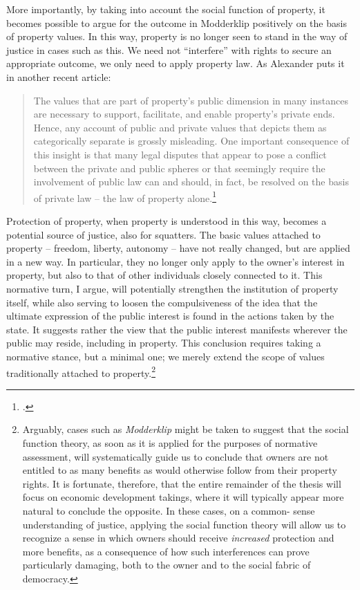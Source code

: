 More importantly, by taking into account the social function of property, it becomes possible to argue for the outcome in Modderklip positively on the basis of property values. In this way, property is no longer seen to stand in the way of justice in cases such as this. We need not ``interfere'' with rights to secure an appropriate outcome, we only need to apply property law. As Alexander puts it in another recent article: 

\begin{quote} The values that are
part of property's public dimension in many instances are necessary
to support, facilitate, and enable property's private ends.
Hence, any account of public and private values that depicts them as categorically
separate is grossly misleading. One important consequence of this
insight is that many legal disputes that appear to pose a conflict between
the private and public spheres or that seemingly
require the involvement of public law can and
should, in fact, be resolved on the basis of private law -- the law
of property alone.\footcite[1295-1296]{alexander14} \end{quote}

Protection of property, when property is understood in this way, becomes a potential source of justice, also for squatters. The basic values attached to property -- freedom, liberty, autonomy -- have not really changed, but are applied in a new way. In particular, they no longer only apply to the owner's interest in property, but also to that of other individuals closely connected to it. This normative turn, I argue, will potentially strengthen the institution of property itself, while also serving to loosen the compulsiveness of the idea that the ultimate expression of the public interest is found in the actions taken by the state. It suggests rather the view that the public interest manifests wherever the public may reside, including in property. This conclusion requires taking a normative stance, but a minimal one; we merely extend the scope of values traditionally attached to property.\footnote{Arguably, cases such as {\it Modderklip} might be taken to suggest that the social function theory, as soon as it is applied for the purposes of normative assessment, will systematically guide us to conclude that owners are not entitled to as many benefits as would otherwise follow from their property rights. It is fortunate, therefore, that the entire remainder of the thesis will focus on economic development takings, where it will typically appear more natural to conclude the opposite. In these cases, on a common- sense understanding of justice, applying the social function theory will allow us to recognize a sense in which owners should receive {\it increased} protection and more benefits, as a consequence of how such interferences can prove particularly damaging, both to the owner and to the social fabric of democracy.} 

